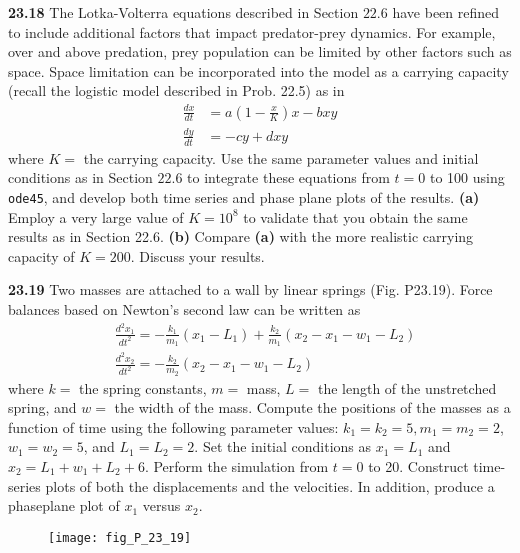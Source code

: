 \documentclass[../main.tex]{subfiles}
\begin{document}
\begin{multicols}{2}
    \noindent\textbf{23.18} The Lotka-Volterra equations described in Section $22.6$ have been refined to include   additional factors that impact predator-prey dynamics. For example, over and above predation, prey population     can be limited by other factors such as space. Space limitation can be incorporated into the model as a     carrying capacity (recall the logistic model described in Prob. 22.5) as in
    $$
    \begin{aligned}
    \frac{d x}{d t} &=a\left(1-\frac{x}{K}\right) x-b x y \\
    \frac{d y}{d t} &=-c y+d x y
    \end{aligned}
    $$
    where $K=$ the carrying capacity. Use the same parameter values and initial conditions as in Section $22.6$     to integrate these equations from $t=0$ to 100 using \texttt{ode45}, and develop both time series and phase     plane plots of the results.
    \textbf{(a)} Employ a very large value of $K=10^{8}$ to validate that you obtain the same results as in     Section 22.6.
    \textbf{(b)} Compare \textbf{(a)} with the more realistic carrying capacity of $K=200$. Discuss your results.   \vspace{2mm}

    \noindent\textbf{23.19} Two masses are attached to a wall by linear springs (Fig. P23.19). Force balances   based on Newton's second law can be written as
    $$
    \begin{aligned}
    &\frac{d^{2} x_{1}}{d t^{2}}=-\frac{k_{1}}{m_{1}}\left(x_{1}-L_{1}\right)+\frac{k_{2}}{m_{1}}\left(x_{2}-x_{1}  -w_{1}-L_{2}\right) \\
    &\frac{d^{2} x_{2}}{d t^{2}}=-\frac{k_{2}}{m_{2}}\left(x_{2}-x_{1}-w_{1}-L_{2}\right)
    \end{aligned}
    $$
    where $k=$ the spring constants, $m=$ mass, $L=$ the length of the unstretched spring, and $w=$ the width of    the mass. Compute the positions of the masses as a function of time using the following parameter values: $k_  {1}=k_{2}=5, m_{1}=m_{2}=2$, $w_{1}=w_{2}=5$, and $L_{1}=L_{2}=2$.
    Set the initial conditions as $x_{1}=L_{1}$ and $x_{2}=L_{1}+w_{1}+L_{2}+6$. Perform the simulation from    $t=0$ to 20. Construct time-series plots of both the displacements and the velocities. In addition, produce a  phaseplane plot of $x_{1}$ versus $x_{2}$.\vspace{2mm}

    \begin{figure}[H]
        \centering
        \texttt{[image: fig\_P\_23\_19]}
        \caption{\textsf{}}
        \label{fig:fig_P_23_19} %
    \end{figure}\vspace{2mm}


\end{multicols}
\end{document}
